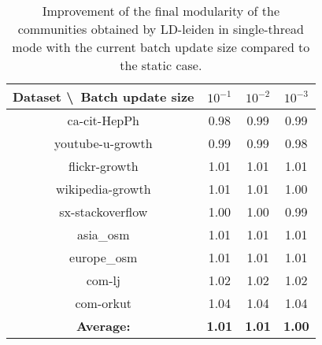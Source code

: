 \begin{table}[H]
	\centering
	\begin{tabular}{|c|c|c|c|}
		\hline
		Dataset \textbackslash\ Batch update size& $10^{-1}$ & $10^{-2}$ & $10^{-3}$ \\
		\hline
		ca-cit-HepPh & 0.98 & 0.99 & 0.99 \\
		\hline
		youtube-u-growth & 0.99 & 0.99 & 0.98 \\
		\hline
		flickr-growth & 1.01 & 1.01 & 1.01 \\
		\hline
		wikipedia-growth & 1.01 & 1.01 & 1.00 \\
		\hline
		sx-stackoverflow & 1.00 & 1.00 & 0.99 \\
		\hline
		asia\_osm & 1.01 & 1.01 & 1.01 \\
		\hline
		europe\_osm & 1.01 & 1.01 & 1.01 \\
		\hline
		com-lj & 1.02 & 1.02 & 1.02 \\
		\hline
		com-orkut & 1.04 & 1.04 & 1.04 \\
		\hline
		\textbf{Average:} & \textbf{1.01} & \textbf{1.01} & \textbf{1.00} \\
		\hline
	\end{tabular}
\caption{Improvement of the final modularity of the communities obtained by LD-leiden in single-thread mode with the current batch update size compared to the static case.}
\label{T:modularity speedup for LD-leiden}
\end{table}